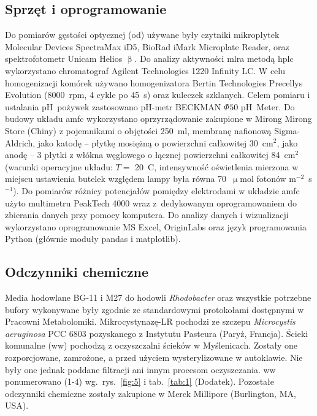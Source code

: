 \subsection{Sprzęt i oprogramowanie}\label{subsec:sprzet}
Do pomiarów gęstości optycznej (\acrshort{od}) używane były czytniki mikropłytek
Molecular Devices SpectraMax iD5, BioRad iMark
Microplate Reader, oraz spektrofotometr Unicam Helios $\upbeta$.
Do analizy aktywności \acrshort{mlra} metodą \acrshort{hplc} wykorzystano chromatograf
Agilent Technologies 1220 Infinity LC\@.
W celu homogenizacji komórek używano homogenizatora
Bertin Technologies Precellys Evolution (8000~rpm, 4 cykle po 45~s)
oraz kuleczek szklanych.
Celem pomiaru i ustalania pH~pożywek zastosowano pH-metr
BECKMAN $\Phi 50$ pH~Meter.
Do budowy układu \acrshort{amfc} wykorzystano oprzyrządowanie
zakupione w Mirong Mirong Store (Chiny) z pojemnikami
o objętości 250~ml, membranę nafionową Sigma-Aldrich,
jako katodę -- płytkę mosiężną o powierzchni całkowitej 30~cm$^{2}$,
jako anodę -- 3 płytki z włókna węglowego
o łącznej powierzchni całkowitej 84~cm$^{2}$
(warunki operacyjne układu:
$T =$ 20~\degree C, intensywność oświetlenia mierzona w miejscu
ustawienia butelek względem lampy była równa
70~$\upmu$mol fotonów m$^{-2}$~s$^{-1}$).
Do pomiarów różnicy potencjałów pomiędzy elektrodami
w układzie \acrshort{amfc} użyto multimetru PeakTech 4000 wraz
z~dedykowanym oprogramowaniem do zbierania danych przy pomocy komputera.
Do analizy danych i wizualizacji wykorzystano oprogramowanie
MS Excel, OriginLabs oraz język programowania Python
(głównie moduły pandas i matplotlib).

\subsection{Odczynniki chemiczne}\label{subsec:odczynniki}
Media hodowlane BG-11 i M27 do hodowli \textit{Rhodobacter} oraz
wszystkie potrzebne bufory wykonywane były zgodnie ze standardowymi
protokołami dostępnymi w Pracowni Metabolomiki.
Mikrocystynazę-LR pochodzi ze szczepu \textit{Microcystis aeruginosa} PCC 6803
pozyskanego z Instytutu Pasteura (Paryż, Francja).
Ścieki komunalne (\acrshort{ww}) pochodzą z oczyszczalni ścieków w Myślenicach.
Zostały one rozporcjowane, zamrożone, a przed użyciem wysterylizowane w autoklawie.
Nie były one jednak poddane filtracji ani innym procesom oczyszczania.
\acrshort{ww} ponumerowano (1-4) wg.\ rys.~\ref{fig:5}
i tab.~\ref{tab:1} (Dodatek).
Pozostałe odczynniki chemiczne zostały zakupione
w Merck Millipore (Burlington, MA, USA).

